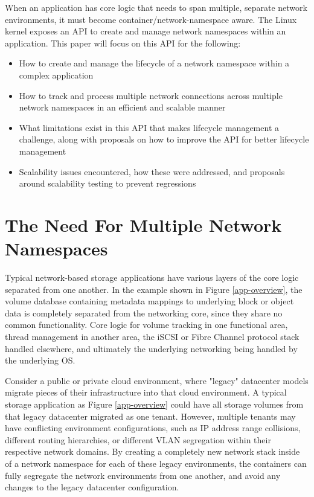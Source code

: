 \documentclass[letterpaper]{article}
\begin{document}
When an application has core logic that needs to span multiple, separate network environments, it must become container/network-namespace aware. The Linux kernel exposes an API to create and manage network namespaces within an application. This paper will focus on this API for the following:
\begin{itemize}
\item How to create and manage the lifecycle of a network namespace within a complex application
\item How to track and process multiple network connections across multiple network namespaces in an efficient and scalable manner
\item What limitations exist in this API that makes lifecycle management a challenge, along with proposals on how to improve the API for better lifecycle management
\item Scalability issues encountered, how these were addressed, and proposals around scalability testing to prevent regressions
\end{itemize}

\section{The Need For Multiple Network Namespaces}
Typical network-based storage applications have various layers of the core logic separated from one another. In the example shown in Figure \ref{app-overview}, the volume database containing metadata mappings to underlying block or object data is completely separated from the networking core, since they share no common functionality. Core logic for volume tracking in one functional area, thread management in another area, the iSCSI or Fibre Channel protocol stack handled elsewhere, and ultimately the underlying networking being handled by the underlying OS.

Consider a public or private cloud environment, where "legacy" datacenter models migrate pieces of their infrastructure into that cloud environment. A typical storage application as Figure \ref{app-overview} could have all storage volumes from that legacy datacenter migrated as one tenant. However, multiple tenants may have conflicting environment configurations, such as IP address range collisions, different routing hierarchies, or different VLAN segregation within their respective network domains. By creating a completely new network stack inside of a network namespace for each of these legacy environments, the containers can fully segregate the network environments from one another, and avoid any changes to the legacy datacenter configuration.
\end{document}
